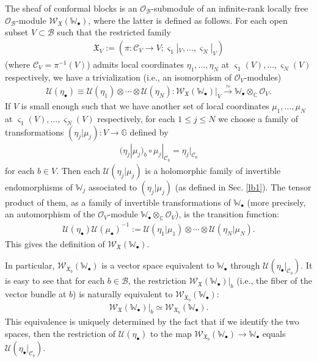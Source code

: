 \documentclass[12pt,a4paper,notitlepage]{article}
\theoremstyle{definition}
\theoremstyle{plain}
\newcommand{\fk}{\mathfrak}
\newcommand{\mc}{\mathcal}
\newcommand{\scr}{\mathscr}
\newcommand{\sgm}{\varsigma}
\newcommand{\blt}{\bullet}
\newcommand{\Wbb}{\mathbb W}
\newcommand{\Gbb}{\mathbb G}
\newcommand{\Cbb}{\mathbb C}
\numberwithin{equation}{section}
\begin{document}
The sheaf of conformal blocks is an $\scr O_{\mc B}$-submodule of an infinite-rank locally free $\scr O_{\mc B}$-module $\scr W_{\fk X}(\Wbb_\blt)$, where the latter is defined as follows. For each open subset $V\subset\mc B$ such that the restricted family \index{XV@$\fk X_V,\mc C_V$}
\begin{align*}
\fk X_V:=(\pi:\mc C_V\rightarrow V;\sgm_1|_V,\dots,\sgm_N|_V)	
\end{align*}
(where $\mc C_V=\pi^{-1}(V)$) admits local coordinates $\eta_1,\dots,\eta_N$ at $\sgm_1(V),\dots,\sgm_N(V)$ respectively,  we have a trivialization (i.e., an isomorphism of $\scr O_V$-modules) \index{U@$\mc U(\eta_\blt)$} \index{WXW@$\scr W_{\fk X}(\Wbb_\blt)$}
\begin{align*}
\mc U(\eta_\blt)\equiv\mc U(\eta_1)\otimes\cdots\otimes\mc U(\eta_N):\scr W_{\fk X}(\Wbb_\blt)|_V\xrightarrow{\simeq} \Wbb_\blt\otimes_\Cbb\scr O_V.	
\end{align*}
If $V$ is small enough such that we have another set of local coordinates $\mu_1,\dots,\mu_N$ at $\sgm_1(V),\dots,\sgm_N(V)$ respectively, for each $1\leq j\leq N$ we choose a family of transformations $(\eta_j|\mu_j):V\rightarrow\Gbb$ defined by 
\begin{align}
\boxed{~(\eta_j|\mu_j)_b\circ\mu_j|_{\mc C_b}=\eta_j|_{\mc C_b}~}	\label{eq8}
\end{align}
for each $b\in V$. Then each $\mc U(\eta_j|\mu_j)$ is a holomorphic family of invertible endomorphisms of $\Wbb_j$ associated to $(\eta_j|\mu_j)$ (as defined in Sec. \ref{lb1}). The tensor product of them, as a family of invertible transformations of $\Wbb_\blt$ (more precisely, an automorphism of the $\scr O_V$-module $\Wbb_\blt\otimes_\Cbb\scr O_V$), is the transition function: 
\begin{align}
\mc U(\eta_\blt)\mc U(\mu_\blt)^{-1}:=\mc U(\eta_1|\mu_1)\otimes\cdots\otimes\mc U(\eta_N|\mu_N).\label{eq11}
\end{align}
This gives the definition of $\scr W_{\fk X}(\Wbb_\blt)$.

In particular, $\scr W_{\fk X_b}(\Wbb_\blt)$ is a vector space equivalent to $\Wbb_\blt$ through $\mc U(\eta_\blt|_{\mc C_b})$. It is easy to see that for each $b\in\mc B$, the restriction $\scr W_{\fk X}(\Wbb_\blt)|_b$ (i.e., the fiber of the vector bundle at $b$) is naturally equivalent to $\scr W_{\fk X_b}(\Wbb_\blt)$:
\begin{align}
\scr W_{\fk X}(\Wbb_\blt)|_b\simeq	 \scr W_{\fk X_b}(\Wbb_\blt).\label{eq6}
\end{align}
This equivalence is uniquely determined by the fact that if we identify the two spaces, then  the restriction of $\mc U(\eta_\blt)$ to the map $\scr W_{\fk X_b}(\Wbb_\blt)\rightarrow\Wbb_\blt$ equals $\mc U(\eta_\blt|_{\mc C_b})$. 
\end{document}
